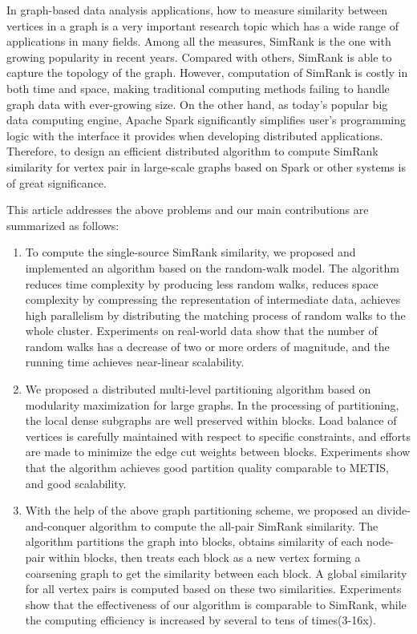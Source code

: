 \documentclass[master]{njuthesis}
\begin{document}
\begin{englishabstract}
In graph-based data analysis applications, how to measure similarity between vertices in a graph is a
very important research topic which has a wide range of applications in many fields.
Among all the measures, SimRank is the one with growing popularity in recent years.
Compared with others, SimRank is able to capture the topology of the  graph. 
However, computation of SimRank is costly in both time and space, making traditional computing methods
failing to handle graph data with ever-growing size.
On the other hand, as today's popular big data computing engine, Apache Spark significantly simplifies user's programming logic
with the interface it provides when developing distributed applications. 
Therefore, to design an efficient distributed algorithm to compute SimRank similarity for vertex pair in large-scale graphs
based on Spark or other systems is of great significance.

This article addresses the above problems and our main contributions are summarized as follows:
\begin{enumerate}
 \item To compute the single-source SimRank similarity, we proposed and implemented an algorithm based on the random-walk model.
 The algorithm reduces time complexity by producing less random walks, 
 reduces space complexity by compressing the representation of intermediate data,
 achieves high parallelism by distributing the matching process of random walks to the whole cluster.
 Experiments on real-world data show that the number of random walks has a decrease of two or more orders of magnitude,
 and the running time achieves near-linear scalability.
 \item We proposed a distributed multi-level  partitioning algorithm based on modularity maximization for large graphs.
 In the processing of partitioning, the local dense subgraphs are well preserved within blocks.
 Load balance of vertices is carefully maintained with respect to specific constraints, 
 and efforts are made to minimize the edge cut weights between blocks. 
 Experiments show that the algorithm achieves good partition quality comparable to METIS, and good scalability.
 \item With the help of the above graph partitioning scheme, we proposed an divide-and-conquer algorithm to 
 compute the all-pair SimRank similarity.
 The algorithm partitions the graph into blocks, obtains similarity of each node-pair within blocks, then treats each 
 block as a new vertex forming a coarsening graph to get the similarity between each block. 
 A global similarity for all vertex pairs is computed based on these two similarities.
 Experiments show that the effectiveness of our algorithm is comparable to SimRank,
 while the computing efficiency is increased by several to tens of times(3-16x).
 \end{enumerate}

\end{englishabstract}
\end{document}
